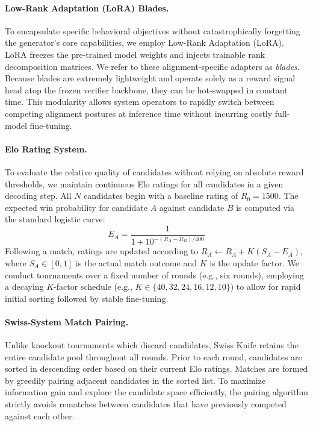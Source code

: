 \documentclass[letterpaper]{article} %
\begin{document}
\paragraph{Low-Rank Adaptation (LoRA) Blades.}
To encapsulate specific behavioral objectives without catastrophically forgetting the generator's core capabilities, we employ Low-Rank Adaptation (LoRA). LoRA freezes the pre-trained model weights and injects trainable rank decomposition matrices. We refer to these alignment-specific adapters as \emph{blades}. Because blades are extremely lightweight and operate solely as a reward signal head atop the frozen verifier backbone, they can be hot-swapped in constant time. This modularity allows system operators to rapidly switch between competing alignment postures at inference time without incurring costly full-model fine-tuning.

\paragraph{Elo Rating System.} 
To evaluate the relative quality of candidates without relying on absolute reward thresholds, we maintain continuous Elo ratings for all candidates in a given decoding step. All $N$ candidates begin with a baseline rating of $R_0 = 1500$. The expected win probability for candidate $A$ against candidate $B$ is computed via the standard logistic curve:
\[
E_A = \frac{1}{1 + 10^{-(R_A - R_B) / 400}}
\]
Following a match, ratings are updated according to $R_A \leftarrow R_A + K(S_A - E_A)$, where $S_A \in [0, 1]$ is the actual match outcome and $K$ is the update factor. We conduct tournaments over a fixed number of rounds (e.g., six rounds), employing a decaying $K$-factor schedule (e.g., $K \in \{40, 32, 24, 16, 12, 10\}$) to allow for rapid initial sorting followed by stable fine-tuning.

\paragraph{Swiss-System Match Pairing.}
Unlike knockout tournaments which discard candidates, Swiss Knife retains the entire candidate pool throughout all rounds. Prior to each round, candidates are sorted in descending order based on their current Elo ratings. Matches are formed by greedily pairing adjacent candidates in the sorted list. To maximize information gain and explore the candidate space efficiently, the pairing algorithm strictly avoids rematches between candidates that have previously competed against each other.
\end{document}
